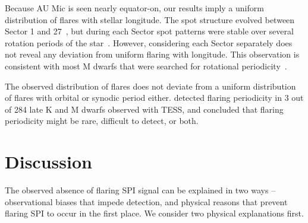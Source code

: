 \documentclass[fleqn,usenatbib,letters]{mnras}%
\begin{document}
Because AU Mic is seen nearly equator-on, our results imply a uniform distribution of flares with stellar longitude. The spot structure evolved between Sector 1 and 27~\citep{martioli2021new}, but during each Sector spot patterns were stable over several rotation periods of the star~\citep{szabo2021changing}. However, considering each Sector separately does not reveal any deviation from uniform flaring with longitude. This observation is consistent with most M dwarfs that were searched for rotational periodicity~\citep{doyle2018, doyle2019}. 

The observed distribution of flares does not deviate from a uniform distribution of flares with orbital or synodic period either.  \citet{howard2021evryflare} detected flaring periodicity in 3 out of 284 late K and M dwarfs observed with TESS, and concluded that flaring periodicity might be rare, difficult to detect, or both. 



\section{Discussion}
\label{sec:discussion}

The observed absence of flaring SPI signal can be explained in two ways -- observational biases that impede detection, and physical reasons that prevent flaring SPI to occur in the first place. We consider two physical explanations first.
\end{document}
